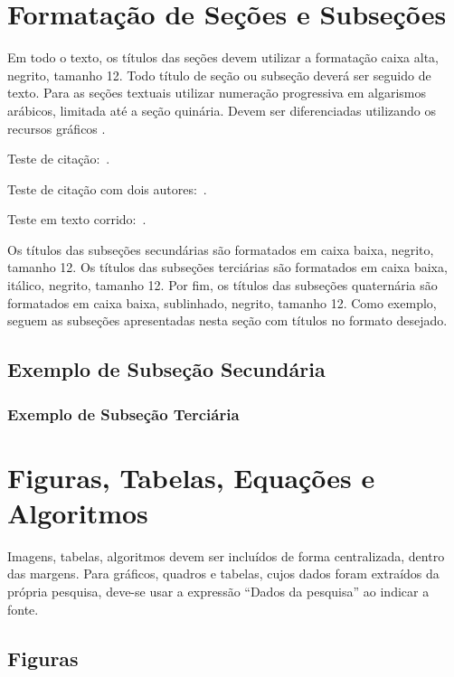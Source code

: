\documentclass[a4paper,12pt]{article}
\begin{document}
	
	\section{Formatação de Seções e Subseções}
	\label{sec:sec}
	
	Em todo o texto, os títulos das seções devem utilizar a formatação caixa alta, negrito, tamanho 12. Todo título de seção ou subseção deverá ser seguido de texto. Para as seções textuais utilizar numeração progressiva em algarismos arábicos, limitada até a seção quinária. Devem ser diferenciadas utilizando os recursos gráficos \cite{manualpucartigo}.
	
	Teste de citação:~\cite{ponciano2018agreement}. 
	
	Teste de citação com dois autores:~\cite{ponciano2018agreement, ferreira}. 
	
	Teste em texto corrido:~. 
	
	
	Os títulos das subseções secundárias são formatados em caixa baixa, negrito, tamanho 12. Os títulos das subseções terciárias são formatados em caixa baixa, itálico, negrito, tamanho 12. Por fim, os títulos das subseções quaternária são formatados em caixa baixa, sublinhado, negrito, tamanho 12. Como exemplo, seguem as subseções apresentadas nesta seção com títulos no formato desejado.
	
	\subsection{Exemplo de Subseção Secundária}
	\subsubsection{Exemplo de Subseção Terciária}
	
	
	\section{Figuras, Tabelas, Equações e Algoritmos}
	\label{sec:figTabEqAlg}
	
	Imagens, tabelas, algoritmos devem ser incluídos de forma centralizada, dentro das margens. Para gráficos, quadros e tabelas, cujos dados foram extraídos da própria pesquisa, deve-se  usar a expressão “Dados da pesquisa” ao indicar a fonte.
	
	\subsection{Figuras}
	
\end{document}
